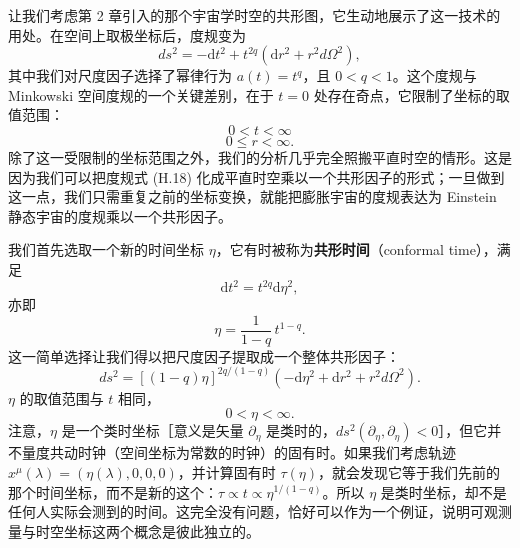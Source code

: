 让我们考虑第 2 章引入的那个宇宙学时空的共形图，它生动地展示了这一技术的用处。在空间上取极坐标后，度规变为
\begin{equation*}
ds^{2} = -\mathrm{d}t^{2} + t^{2q}\left(\mathrm{d}r^{2} + r^{2}d\Omega^{2}\right),
\tag{H.18}
\end{equation*}
其中我们对尺度因子选择了幂律行为 $a(t) = t^{q}$，且 $0 < q < 1$。这个度规与 Minkowski 空间度规的一个关键差别，在于 $t = 0$ 处存在奇点，它限制了坐标的取值范围：
\begin{equation*}
0 < t < \infty
\tag{H.19}
\end{equation*}
\begin{equation*}
0 \le r < \infty.
\tag{H.20}
\end{equation*}
除了这一受限制的坐标范围之外，我们的分析几乎完全照搬平直时空的情形。这是因为我们可以把度规式 (H.18) 化成平直时空乘以一个共形因子的形式；一旦做到这一点，我们只需重复之前的坐标变换，就能把膨胀宇宙的度规表达为 Einstein 静态宇宙的度规乘以一个共形因子。

我们首先选取一个新的时间坐标 $\eta$，它有时被称为\textbf{共形时间}（conformal time），满足
\begin{equation*}
\mathrm{d}t^{2} = t^{2q}\mathrm{d}\eta^{2},
\tag{H.21}
\end{equation*}
亦即
\begin{equation*}
\eta = \frac{1}{1-q}\,t^{1-q}.
\tag{H.22}
\end{equation*}
这一简单选择让我们得以把尺度因子提取成一个整体共形因子：
\begin{equation*}
ds^{2} = \left[(1-q)\eta\right]^{2q/(1-q)}\left(-\mathrm{d}\eta^{2} + \mathrm{d}r^{2} + r^{2}d\Omega^{2}\right).
\tag{H.23}
\end{equation*}
$\eta$ 的取值范围与 $t$ 相同，
\begin{equation*}
0 < \eta < \infty.
\tag{H.24}
\end{equation*}
注意，$\eta$ 是一个类时坐标［意义是矢量 $\partial_{\eta}$ 是类时的，$ds^{2}(\partial_{\eta},\partial_{\eta}) < 0$］，但它并不量度共动时钟（空间坐标为常数的时钟）的固有时。如果我们考虑轨迹 $x^{\mu}(\lambda) = (\eta(\lambda), 0, 0, 0)$，并计算固有时 $\tau(\eta)$，就会发现它等于我们先前的那个时间坐标，而不是新的这个：$\tau \propto t \propto \eta^{1/(1-q)}$。所以 $\eta$ 是类时坐标，却不是任何人实际会测到的时间。这完全没有问题，恰好可以作为一个例证，说明可观测量与时空坐标这两个概念是彼此独立的。

